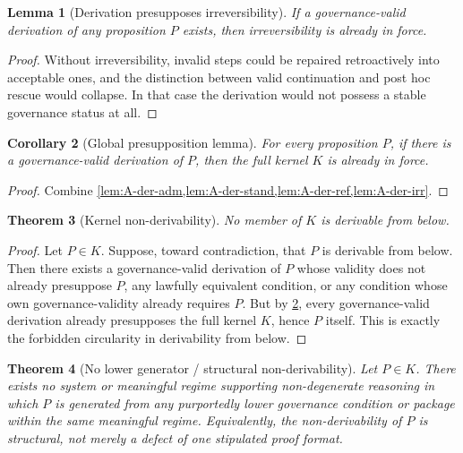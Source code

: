 \documentclass[11pt]{article}
\theoremstyle{plain}
\newtheorem{theorem}{Theorem}[section]
\newtheorem{lemma}[theorem]{Lemma}
\newtheorem{corollary}[theorem]{Corollary}
\theoremstyle{definition}
\begin{document}
\begin{lemma}[Derivation presupposes irreversibility]
\label{lem:A-der-irr}
If a governance-valid derivation of any proposition $P$ exists, then irreversibility is already in force.
\end{lemma}

\begin{proof}
Without irreversibility, invalid steps could be repaired retroactively into acceptable ones, and the distinction between valid continuation and post hoc rescue would collapse. In that case the derivation would not possess a stable governance status at all.
\end{proof}

\begin{corollary}[Global presupposition lemma]
\label{cor:A-global-presupposition}
For every proposition $P$, if there is a governance-valid derivation of $P$, then the full kernel $K$ is already in force.
\end{corollary}

\begin{proof}
Combine \cref{lem:A-der-adm,lem:A-der-stand,lem:A-der-ref,lem:A-der-irr}.
\end{proof}

\begin{theorem}[Kernel non-derivability]
\label{thm:A-kernel-nonderivable}
No member of $K$ is derivable from below.
\end{theorem}

\begin{proof}
Let $P\in K$. Suppose, toward contradiction, that $P$ is derivable from below. Then there exists a governance-valid derivation of $P$ whose validity does not already presuppose $P$, any lawfully equivalent condition, or any condition whose own governance-validity already requires $P$. But by \cref{cor:A-global-presupposition}, every governance-valid derivation already presupposes the full kernel $K$, hence $P$ itself. This is exactly the forbidden circularity in derivability from below.
\end{proof}

\begin{theorem}[No lower generator / structural non-derivability]
\label{thm:A-structural-nonderivability}
Let $P\in K$. There exists no system or meaningful regime supporting non-degenerate reasoning in which $P$ is generated from any purportedly lower governance condition or package within the same meaningful regime. Equivalently, the non-derivability of $P$ is structural, not merely a defect of one stipulated proof format.
\end{theorem}
\end{document}
